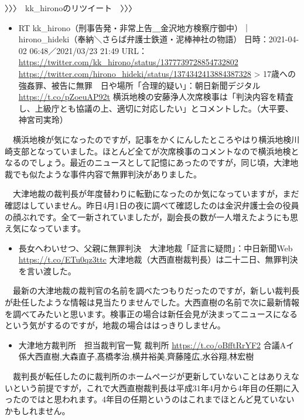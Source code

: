 \documentclass[
]{ltjarticle}
\providecommand{\tightlist}{%
  \setlength{\itemsep}{0pt}\setlength{\parskip}{0pt}}
\begin{document}
〉〉〉　kk\_hironoのリツイート　〉〉〉

\begin{itemize}
\tightlist
\item
  RT
  kk\_hirono（刑事告発・非常上告＿金沢地方検察庁御中）｜hirono\_hideki（奉納＼さらば弁護士鉄道・泥棒神社の物語）
  日時：2021-04-02 06:48／2021/03/23 21:49 URL：
  \url{https://twitter.com/kk\_hirono/status/1377739728854732802} 
  \url{https://twitter.com/hirono\_hideki/status/1374342413884387328} 
  \textgreater{}
  17歳への強姦罪、被告に無罪　日や場所「合理的疑い」：朝日新聞デジタル
  \url{https://t.co/pZoeuAP92t} 
  横浜地検の安藤浄人次席検事は「判決内容を精査し、上級庁とも協議の上、適切に対応したい」とコメントした。（大平要、神宮司実玲）
\end{itemize}

　横浜地検が気になったのですが，記事をかくにんしたところやはり横浜地検川崎支部となっていました。ほとんど全てが次席検事のコメントなので横浜地検となるのでしょう。最近のニュースとして記憶にあったのですが，同じ頃，大津地裁でも似たような事件内容で無罪判決がありました。

　大津地裁の裁判長が年度替わりに転勤になったのか気になっていますが，まだ確認はしていません。昨日4月1日の夜に調べて確認したのは金沢弁護士会の役員の顔ぶれです。全て一新されていましたが，副会長の数が一人増えたようにも思え気になっています。

\begin{itemize}
\tightlist
\item
  長女へわいせつ、父親に無罪判決　大津地裁「証言に疑問」：中日新聞Web
  \url{https://t.co/ETu0qz3ttc} 
  大津地裁（大西直樹裁判長）は二十二日、無罪判決を言い渡した。
\end{itemize}

　最新の大津地裁の裁判官の名前を調べたつもりだったのですが，新しい裁判長が赴任したような情報は見当たりませんでした。大西直樹の名前で次に最新情報を調べてみたいと思います。検事正の場合は新任会見が決まってニュースになるという気がするのですが，地裁の場合ははっきりしません。

\begin{itemize}
\tightlist
\item
  大津地方裁判所　担当裁判官一覧 \textbar{} 裁判所
  \url{https://t.co/oBfftRrYF2} 
  合議Aイ係大西直樹,大森直子,髙橋孝治,横井裕美,齊藤隆広,水谷翔,林宏樹
\end{itemize}

　裁判長が転任したのに裁判所のホームページが更新していないことはありえないという前提ですが，これで大西直樹裁判長は平成31年4月から4年目の任期に入ったのではと思われます。4年目の任期というのはこれまでほとんど見ていないかもしれません。
\end{document}
